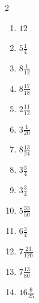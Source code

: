 \documentclass[12pt]{article}
\begin{document}
\begin{multicols}{2}
\begin{enumerate}
\item $ 12 $
\item $ 5 \frac{1}{4} $
\item $ 8 \frac{1}{12} $
\item $ 8 \frac{17}{18} $
\item $ 2 \frac{11}{12} $
\item $ 3 \frac{1}{20} $
\item $ 8 \frac{13}{24} $
\item $ 3 \frac{3}{4} $
\item $ 3 \frac{3}{4} $
\item $ 5 \frac{33}{50} $
\item $ 6 \frac{3}{4} $
\item $ 7 \frac{23}{120} $
\item $ 7 \frac{13}{80} $
\item $ 16 \frac{6}{25} $
\end{enumerate}\end{multicols}\newpage
\end{document}
